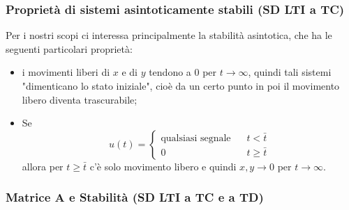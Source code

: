 \subsubsection{Proprietà di sistemi asintoticamente stabili (SD LTI a TC)}
Per i nostri scopi ci interessa principalmente la stabilità asintotica, che ha le seguenti particolari proprietà:
\begin{itemize}
    \item i movimenti liberi di $x$ e di $y$ tendono a $0$ per $t \rightarrow  \infty$, quindi tali sistemi "dimenticano lo stato iniziale", cioè da un certo punto in poi il movimento libero diventa trascurabile;
    \item Se 
    \[
        u(t) = \begin{cases}
            \text{qualsiasi segnale}\; \;\; & t< \bar{t}\\
            0 & t \geq \bar{t}
        \end{cases}
    \]
    allora per $t \geq \bar{t}$ c'è solo movimento libero e quindi $x,y \rightarrow 0$ per $t \rightarrow \infty$.
\end{itemize}
\subsubsection{Matrice A e Stabilità (SD LTI a TC e a TD)}
